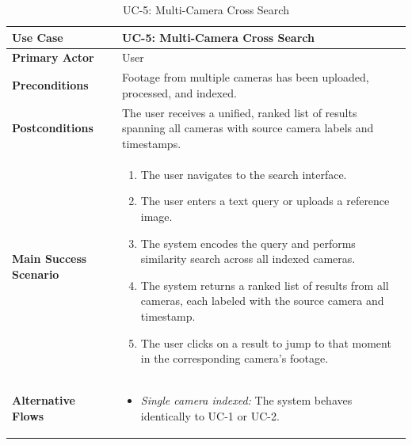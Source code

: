 \begin{table}[H]
\centering
\begin{tabular}{|l|p{10cm}|}
\hline
\textbf{Use Case}       & UC-5: Multi-Camera Cross Search \\ \hline
\textbf{Primary Actor}   & User \\ \hline
\textbf{Preconditions}   & Footage from multiple cameras has been uploaded, processed, and indexed. \\ \hline
\textbf{Postconditions}  & The user receives a unified, ranked list of results spanning all cameras with source camera labels and timestamps. \\ \hline
\textbf{Main Success Scenario} &
    \begin{enumerate}[nosep, leftmargin=*]
        \item The user navigates to the search interface.
        \item The user enters a text query or uploads a reference image.
        \item The system encodes the query and performs similarity search across all indexed cameras.
        \item The system returns a ranked list of results from all cameras, each labeled with the source camera and timestamp.
        \item The user clicks on a result to jump to that moment in the corresponding camera's footage.
    \end{enumerate} \\ \hline
\textbf{Alternative Flows} &
    \begin{itemize}[nosep, leftmargin=*]
        \item \textit{Single camera indexed:} The system behaves identically to UC-1 or UC-2.
    \end{itemize} \\ \hline
\end{tabular}
\caption{UC-5: Multi-Camera Cross Search}
\label{tab:uc5}
\end{table}

